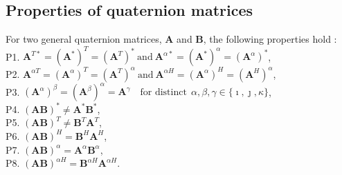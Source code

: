 \documentclass[review]{elsarticle}
\theoremstyle{plain}
\theoremstyle{remark}
\theoremstyle{plain}
\theoremstyle{definition}
\theoremstyle{prop}
\theoremstyle{definition}
\theoremstyle{plain}
\theoremstyle{plain}
\begin{document}
\begin{appendices}
\renewcommand\thesection{\appendixname~\Alph{section}} 
\section{Properties of quaternion matrices}
For two general quaternion matrices, $\mathbf{A}$ and $\mathbf{B}$, the following properties hold \cite{CheongTook2011a}: 
\\ \newline
P1. $\mathbf{A}^{T*}=(\mathbf{A}^*)^T=(\mathbf{A}^T)^*~\text{and}~\mathbf{A}^{\alpha *}=(\mathbf{A}^*)^\alpha=(\mathbf{A}^\alpha)^*$, \\
P2. $\mathbf{A}^{\alpha T}=(\mathbf{A}^\alpha)^T=(\mathbf{A}^T)^\alpha ~ \text{and} ~ \mathbf{A}^{\alpha H}=(\mathbf{A}^\alpha)^H=(\mathbf{A}^H)^\alpha$, \\
P3. $(\mathbf{A}^\alpha)^\beta=(\mathbf{A}^\beta)^\alpha=\mathbf{A}^\gamma \quad \text{for distinct}~~\alpha,\beta,\gamma \in \{\imath,\jmath,\kappa\}$, \\
P4. $(\mathbf{AB})^*\neq\mathbf{A}^*\mathbf{B}^*$, \\
P5. $(\mathbf{AB})^T\neq\mathbf{B}^T\mathbf{A}^T$, \\
P6. $(\mathbf{AB})^H=\mathbf{B}^H\mathbf{A}^H$, \\
P7. $(\mathbf{AB})^\alpha=\mathbf{A}^\alpha\mathbf{B}^\alpha$, \\
P8. $(\mathbf{AB})^{\alpha H}=\mathbf{B}^{\alpha H}\mathbf{A}^{\alpha H}$.\\


\end{appendices}
\end{document}
